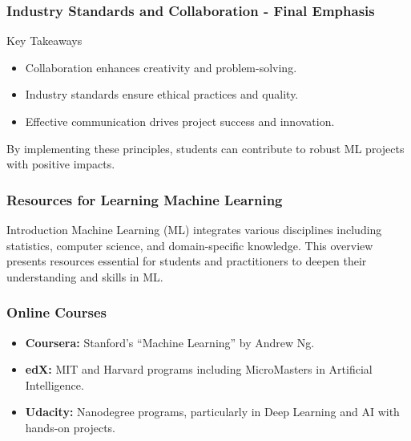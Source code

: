 \documentclass{beamer}
\begin{document}
\begin{frame}[fragile]
    \frametitle{Industry Standards and Collaboration - Final Emphasis}
    \begin{block}{Key Takeaways}
        \begin{itemize}
            \item Collaboration enhances creativity and problem-solving.
            \item Industry standards ensure ethical practices and quality.
            \item Effective communication drives project success and innovation.
        \end{itemize}
        
        By implementing these principles, students can contribute to robust ML projects with positive impacts.
    \end{block}
\end{frame}

\begin{frame}
    \frametitle{Resources for Learning Machine Learning}
    \begin{block}{Introduction}
        Machine Learning (ML) integrates various disciplines including statistics, computer science, and domain-specific knowledge. This overview presents resources essential for students and practitioners to deepen their understanding and skills in ML.
    \end{block}
\end{frame}

\begin{frame}
    \frametitle{Online Courses}
    \begin{itemize}
        \item \textbf{Coursera:} Stanford's ``Machine Learning'' by Andrew Ng.
        \item \textbf{edX:} MIT and Harvard programs including MicroMasters in Artificial Intelligence.
        \item \textbf{Udacity:} Nanodegree programs, particularly in Deep Learning and AI with hands-on projects.
    \end{itemize}
\end{frame}
\end{document}
